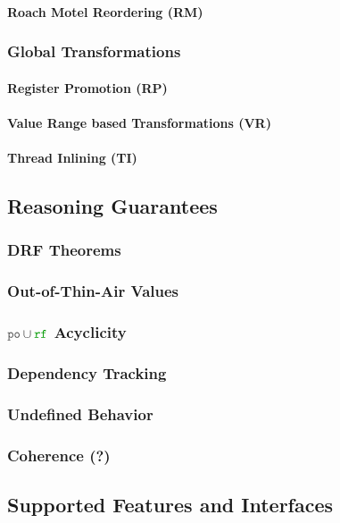 \paragraph{Roach Motel Reordering (RM)}

\subsubsection{Global Transformations}

\paragraph{Register Promotion (RP)}

\paragraph{Value Range based Transformations (VR)}

\paragraph{Thread Inlining (TI)}

\subsection{Reasoning Guarantees}

\subsubsection{DRF Theorems}
\label{sec:bgrnd-drf}

\subsubsection{Out-of-Thin-Air Values}
\label{sec:bgrnd-oota}

\subsubsection{$\lPO\cup\lRF$ Acyclicity}

\subsubsection{Dependency Tracking}

\subsubsection{Undefined Behavior}
\label{sec:bgrnd-ub}

\subsubsection{Coherence (?)}

\subsection{Supported Features and Interfaces}

